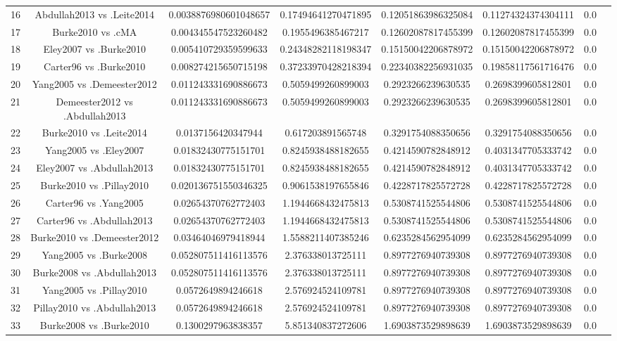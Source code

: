 \documentclass[a4paper,10pt]{article}
\begin{document}
\begin{landscape}
\begin{table}[!htp]
\begin{tabular}{cccccccc}
16&Abdullah2013 vs .Leite2014&0.0038876980601048657&0.17494641270471895&0.12051863986325084&0.11274324374304111&0.0\\
17&Burke2010 vs .cMA&0.004345547523260482&0.1955496385467217&0.12602087817455399&0.12602087817455399&0.0\\
18&Eley2007 vs .Burke2010&0.005410729359599633&0.24348282118198347&0.15150042206878972&0.15150042206878972&0.0\\
19&Carter96 vs .Burke2010&0.008274215650715198&0.37233970428218394&0.22340382256931035&0.19858117561716476&0.0\\
20&Yang2005 vs .Demeester2012&0.011243331690886673&0.5059499260899003&0.2923266239630535&0.2698399605812801&0.0\\
21&Demeester2012 vs .Abdullah2013&0.011243331690886673&0.5059499260899003&0.2923266239630535&0.2698399605812801&0.0\\
22&Burke2010 vs .Leite2014&0.0137156420347944&0.617203891565748&0.3291754088350656&0.3291754088350656&0.0\\
23&Yang2005 vs .Eley2007&0.01832430775151701&0.8245938488182655&0.4214590782848912&0.4031347705333742&0.0\\
24&Eley2007 vs .Abdullah2013&0.01832430775151701&0.8245938488182655&0.4214590782848912&0.4031347705333742&0.0\\
25&Burke2010 vs .Pillay2010&0.020136751550346325&0.9061538197655846&0.4228717825572728&0.4228717825572728&0.0\\
26&Carter96 vs .Yang2005&0.02654370762772403&1.1944668432475813&0.5308741525544806&0.5308741525544806&0.0\\
27&Carter96 vs .Abdullah2013&0.02654370762772403&1.1944668432475813&0.5308741525544806&0.5308741525544806&0.0\\
28&Burke2010 vs .Demeester2012&0.03464046979418944&1.5588211407385246&0.6235284562954099&0.6235284562954099&0.0\\
29&Yang2005 vs .Burke2008&0.052807511416113576&2.376338013725111&0.8977276940739308&0.8977276940739308&0.0\\
30&Burke2008 vs .Abdullah2013&0.052807511416113576&2.376338013725111&0.8977276940739308&0.8977276940739308&0.0\\
31&Yang2005 vs .Pillay2010&0.0572649894246618&2.576924524109781&0.8977276940739308&0.8977276940739308&0.0\\
32&Pillay2010 vs .Abdullah2013&0.0572649894246618&2.576924524109781&0.8977276940739308&0.8977276940739308&0.0\\
33&Burke2008 vs .Burke2010&0.1300297963838357&5.851340837272606&1.6903873529898639&1.6903873529898639&0.0\\

\end{tabular}
\end{table}
\end{landscape}
\end{document}
